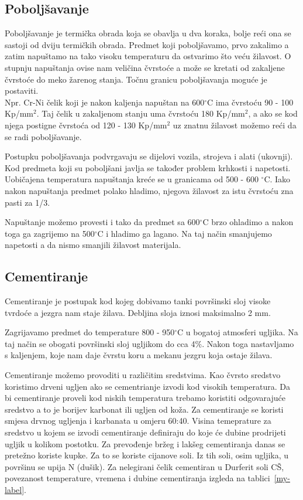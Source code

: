 \documentclass[a4paper,12pt]{article}
\numberwithin{figure}{section}
\begin{document}
\subsection{Poboljšavanje}
Poboljšavanje je termička obrada koja se obavlja u dva koraka, bolje reći ona se sastoji od dviju termičkih obrada. Predmet koji poboljšavamo, prvo zakalimo a zatim napuštamo na tako visoku temperaturu da ostvarimo što veću žilavost. O stupnju napuštanja ovise nam veličina čvrstoće a može se kretati od zakaljene čvrstoće do meko žarenog stanja. Točnu granicu poboljšavanja moguće je postaviti.\\
Npr. Cr-Ni čelik koji je nakon kaljenja napuštan na 600$^{\circ}$C ima čvrstoću 90 - 100 Kp/mm$^{2}$. Taj čelik u zakaljenom stanju uma čvrstoću 180 Kp/mm$^{2}$, a ako se kod njega postigne čvrstoća od 120 - 130 Kp/mm$^{2}$ uz znatnu žilavost možemo reći da se radi poboljšavanje. \par
Postupku poboljšavanja podvrgavaju se dijelovi vozila, strojeva i alati (ukovnji). Kod predmeta koji su poboljšani javlja se također problem krhkosti i napetosti. Uobičajena temperatura napuštanja kreće se u granicama od 500 - 600 $^{\circ}$C. Iako nakon napuštanja predmet polako hladimo, njegova žilavost za istu čvrstoću zna pasti za 1/3.\par
Napuštanje možemo provesti i tako da predmet sa 600$^{\circ}$C brzo ohladimo a nakon toga ga zagrijemo na 500$^{\circ}$C i hladimo ga lagano. Na taj način smanjujemo napetosti a da nismo smanjili žilavost materijala.
\subsection{Cementiranje}
Cementiranje je postupak kod kojeg dobivamo tanki površinski sloj visoke tvrdoće a jezgra nam staje žilava. Debljina sloja iznosi maksimalno 2 mm. \par
Zagrijavamo predmet do temperature 800 - 950$^{\circ}$C u bogatoj atmosferi ugljika. Na taj način se obogati površinski sloj ugljikom do cca 4$\%$. Nakon toga nastavljamo s kaljenjem, koje nam daje čvrstu koru a mekanu jezgru koja ostaje žilava.\par
Cementiranje možemo provoditi u različitim sredstvima. Kao čvrsto sredstvo koristimo drveni ugljen ako se cementrianje izvodi kod visokih temperatura. Da bi cementiranje proveli kod niskih temperatura trebamo koristiti odgovarajuće sredstvo a to je borijev karbonat ili ugljen od koža. Za cementiranje se koristi smjesa drvnog ugljenja i karbanata u  omjeru 60:40. Visina temeprature za sredstvo u kojem se izvodi cementiranje definiraju do koje će dubine prodrijeti ugljik u kolikom postotku. Za prevođenje bržeg i lakšeg cementiranja danas se pretežno koriste kupke. Za to se koriste cijanove soli. Iz tih soli, osim ugljika, u površinu se upija N (dušik). Za nelegirani čelik cementiran u Durferit soli CŠ, povezanost temperature, vremena i dubine cementiranja izgleda na tablici~\ref{my-label}.
\end{document}

